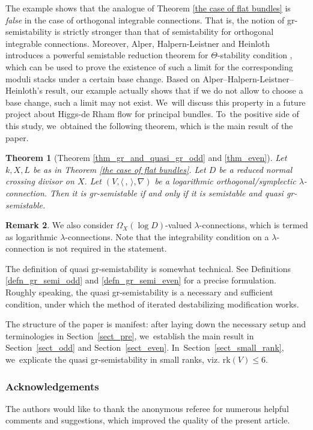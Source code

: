 \documentclass[JEP,XML,SOM,Unicode,published]{cedram}
\newcommand{\lconnection}{$\lambda$\nobreakdash-con\-nec\-tion\xspace}
\newcommand{\lconnections}{$\lambda$\nobreakdash-con\-nec\-tions\xspace}
\newcommand{\grsemistable}{gr\nobreakdash-semi\-stable\xspace}
\newcommand{\rk}{\mathrm{rk}}
\theoremstyle{plain}
\newtheorem{thm}{Theorem}[section]
\theoremstyle{definition}
\newtheorem{rem}[thm]{Remark}
\begin{document}
The example shows that the analogue of Theorem \ref{the case of flat bundles} is \emph{false} in the case of orthogonal integrable connections. That is, the notion of gr-semistability is strictly stronger than that of semistability for orthogonal integrable connections. Moreover, Alper, Halpern-Leistner and Heinloth introduces a powerful semistable reduction theorem for $\Theta$-stability condition \cite[Th.\,6.5]{AHLH23}, which can be used to prove the existence of such a limit for the corresponding moduli stacks under a certain base change. Based on Alper--Halpern-Leistner--Heinloth's result, our example actually shows that if we do not allow to choose a base change, such a limit may not exist. We~will discuss this property in a future project about Higgs-de Rham flow for principal bundles. To~the positive side of this study, we~obtained the following theorem, which is the main result of the paper.
\begin{thm}[Theorem \ref{thm_gr_and_quasi_gr_odd} and \ref{thm_even}]
Let $k,X,L$ be as in Theorem \ref{the case of flat bundles}. Let $D$ be a reduced normal crossing divisor on $X$. Let $(V,\langle \,, \, \rangle,\nabla)$ be a logarithmic orthogonal/symplectic \lconnection. Then it is \grsemistable if and only if it is semistable and quasi \grsemistable.
\end{thm}
\begin{rem}
We also consider $\Omega_X(\log D)$-valued \lconnections, which is termed as logarithmic \lconnections. Note that the integrability condition on a \lconnection is not required in the statement.
\end{rem}

The definition of quasi gr-semistability is somewhat technical. See Definitions \ref{defn_gr_semi_odd} and \ref{defn_gr_semi_even} for a precise formulation. Roughly speaking, the quasi gr-semistability is a necessary and sufficient condition, under which the method of iterated destabilizing modification works.

The structure of the paper is manifest: after laying down the necessary setup and terminologies in Section~\ref{sect_pre}, we~establish the main result in Section~\ref{sect_odd} and Section~\ref{sect_even}. In~Section~\ref{sect_small_rank}, we~explicate the quasi gr-semistability in small ranks, viz. $\rk(V)\leq 6$.

\subsubsection*{Acknowledgements}
The authors would like to thank the anonymous referee for numerous helpful comments and suggestions, which improved the quality of the present article.
\end{document}
